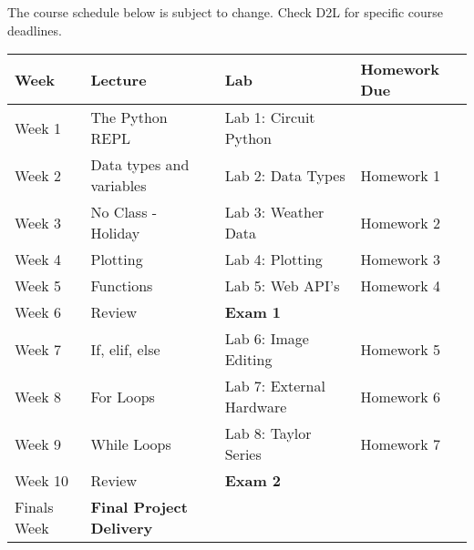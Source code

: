 \documentclass[11pt]{article}
\begin{document}
The course schedule below is subject to change. Check D2L for specific
course deadlines.

\begin{longtable}[]{@{}llll@{}}
\toprule
Week & Lecture & Lab & Homework Due\tabularnewline
\midrule
\endhead
Week 1 & The Python REPL & Lab 1: Circuit Python &\tabularnewline
Week 2 & Data types and variables & Lab 2: Data Types & Homework
1\tabularnewline
Week 3 & No Class - Holiday & Lab 3: Weather Data & Homework
2\tabularnewline
Week 4 & Plotting & Lab 4: Plotting & Homework 3\tabularnewline
Week 5 & Functions & Lab 5: Web API's & Homework 4\tabularnewline
Week 6 & Review & \textbf{Exam 1} &\tabularnewline
Week 7 & If, elif, else & Lab 6: Image Editing & Homework
5\tabularnewline
Week 8 & For Loops & Lab 7: External Hardware & Homework
6\tabularnewline
Week 9 & While Loops & Lab 8: Taylor Series & Homework 7\tabularnewline
Week 10 & Review & \textbf{Exam 2} &\tabularnewline
Finals Week & \textbf{Final Project Delivery} & &\tabularnewline
\bottomrule
\end{longtable}


    
    
    
\end{document}
